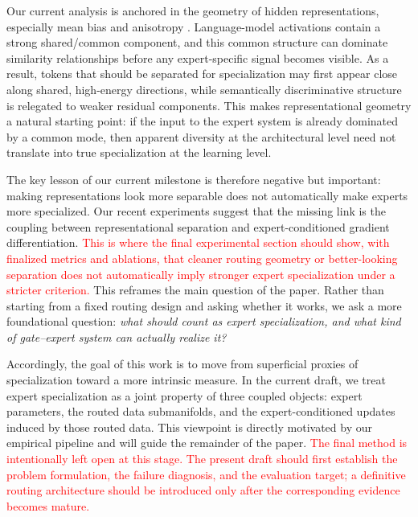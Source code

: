 Our current analysis is anchored in the geometry of hidden representations, especially mean bias and anisotropy \citep{ethayarajh2019contextual,chi2022representation}. Language-model activations contain a strong shared/common component, and this common structure can dominate similarity relationships before any expert-specific signal becomes visible. As a result, tokens that should be separated for specialization may first appear close along shared, high-energy directions, while semantically discriminative structure is relegated to weaker residual components. This makes representational geometry a natural starting point: if the input to the expert system is already dominated by a common mode, then apparent diversity at the architectural level need not translate into true specialization at the learning level.

The key lesson of our current milestone is therefore negative but important: making representations look more separable does not automatically make experts more specialized. Our recent experiments suggest that the missing link is the coupling between representational separation and expert-conditioned gradient differentiation. \textcolor{red}{This is where the final experimental section should show, with finalized metrics and ablations, that cleaner routing geometry or better-looking separation does not automatically imply stronger expert specialization under a stricter criterion.} This reframes the main question of the paper. Rather than starting from a fixed routing design and asking whether it works, we ask a more foundational question: \emph{what should count as expert specialization, and what kind of gate--expert system can actually realize it?}

Accordingly, the goal of this work is to move from superficial proxies of specialization toward a more intrinsic measure. In the current draft, we treat expert specialization as a joint property of three coupled objects: expert parameters, the routed data submanifolds, and the expert-conditioned updates induced by those routed data. This viewpoint is directly motivated by our empirical pipeline and will guide the remainder of the paper. \textcolor{red}{The final method is intentionally left open at this stage. The present draft should first establish the problem formulation, the failure diagnosis, and the evaluation target; a definitive routing architecture should be introduced only after the corresponding evidence becomes mature.}

